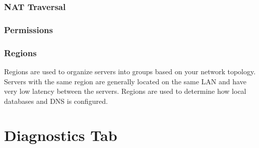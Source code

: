 \documentclass[letterpaper,10pt,english]{sphinxmanual}
\begin{document}
\subsubsection{NAT Traversal}
\label{\detokenize{webui:nat-traversal}}\label{\detokenize{webui:id56}}\begin{quote}



\end{quote}


\subsubsection{Permissions}
\label{\detokenize{webui:permissions}}\label{\detokenize{webui:id57}}\begin{quote}

\end{quote}


\subsubsection{Regions}
\label{\detokenize{webui:regions}}\label{\detokenize{webui:id58}}
Regions are used to organize servers into groups based on your network topology. Servers with the same region are generally located on the same LAN and have very low latency between the servers. Regions are used to determine how local databases and DNS is configured.
\begin{quote}

\end{quote}


\section{Diagnostics Tab}
\label{\detokenize{webui:diagnostics-tab}}\label{\detokenize{webui:id59}}\begin{quote}

\end{quote}
\end{document}
